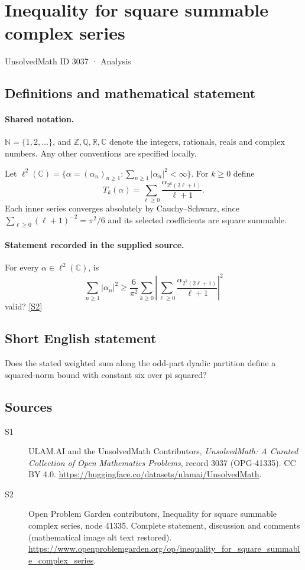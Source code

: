 \documentclass[11pt]{book}
\newcommand{\sref}[2]{\hyperlink{source:#1:#2}{[S#2]}}
\begin{document}
\setcounter{section}{3036}
\section{Inequality for square summable complex series}\label{3037}
{\small\sffamily UnsolvedMath ID 3037 · Analysis}
\subsection{Definitions and mathematical statement}

\paragraph{Shared notation.}$\mathbb N=\{1,2,\ldots\}$, and $\mathbb Z,\mathbb Q,\mathbb R,\mathbb C$ denote the integers, rationals, reals and complex numbers. Any other conventions are specified locally.


Let $\ell^2(\mathbb C)=\{\alpha=(\alpha_n)_{n\geq1}:\sum_{n\geq1}|\alpha_n|^2<\infty\}$. For $k\geq0$ define
\[T_k(\alpha)=\sum_{\ell\geq0}\frac{\alpha_{2^k(2\ell+1)}}{\ell+1}.\]
Each inner series converges absolutely by Cauchy--Schwarz, since $\sum_{\ell\geq0}(\ell+1)^{-2}=\pi^2/6$ and its selected coefficients are square summable.
\paragraph{Statement recorded in the supplied source.}
For every $\alpha\in\ell^2(\mathbb C)$, is
\[\sum_{n\geq1}|\alpha_n|^2\geq\frac{6}{\pi^2}\sum_{k\geq0}\left|\sum_{\ell\geq0}\frac{\alpha_{2^k(2\ell+1)}}{\ell+1}\right|^2\]
valid? \sref{3037}{2}
\subsection{Short English statement}
Does the stated weighted sum along the odd-part dyadic partition define a squared-norm bound with constant six over pi squared?
\subsection{Sources}
\begin{description}
\item[\hypertarget{source:3037:1}{S1}] ULAM.AI and the UnsolvedMath Contributors, \emph{UnsolvedMath: A Curated Collection of Open Mathematics Problems}, record 3037 (OPG-41335). CC BY 4.0. \url{https://huggingface.co/datasets/ulamai/UnsolvedMath}.
\item[\hypertarget{source:3037:2}{S2}] Open Problem Garden contributors, Inequality for square summable complex series, node 41335. Complete statement, discussion and comments (mathematical image alt text restored). \url{https://www.openproblemgarden.org/op/inequality_for_square_summable_complex_series}.
\end{description}
\label{end:3037}
\end{document}

